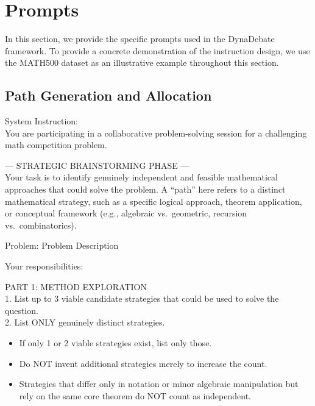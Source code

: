 \section{Prompts}
\label{app:prompts}
In this section, we provide the specific prompts used in the DynaDebate framework. To provide a concrete demonstration of the instruction design, we use the MATH500 dataset as an illustrative example throughout this section.

\subsection{Path Generation and Allocation}
\label{app:prompt_path}

\begin{tcolorbox}[
    breakable,
    colback=white,
    colframe=black,
    boxrule=0.8pt,
    left=6pt,
    right=6pt,
    top=6pt,
    bottom=6pt
]
\ttfamily\small
System Instruction:\\
You are participating in a collaborative problem-solving session for a challenging math competition problem.

\vspace{0.5em}
--- STRATEGIC BRAINSTORMING PHASE ---\\
Your task is to identify genuinely independent and feasible mathematical approaches that could solve the problem.
A ``path'' here refers to a distinct mathematical strategy, such as a specific logical approach, theorem application,
or conceptual framework (e.g., algebraic vs.\ geometric, recursion vs.\ combinatorics).

\vspace{0.5em}
Problem: \lbrack Problem Description\rbrack

\vspace{0.5em}
Your responsibilities:

\vspace{0.25em}
PART 1: METHOD EXPLORATION\\
1. List up to 3 viable candidate strategies that could be used to solve the question.\\
2. List ONLY genuinely distinct strategies.
\begin{itemize}
    \item If only 1 or 2 viable strategies exist, list only those.
    \item Do NOT invent additional strategies merely to increase the count.
    \item Strategies that differ only in notation or minor algebraic manipulation but rely on the same core theorem
    do NOT count as independent.
\end{itemize}


\end{tcolorbox}
